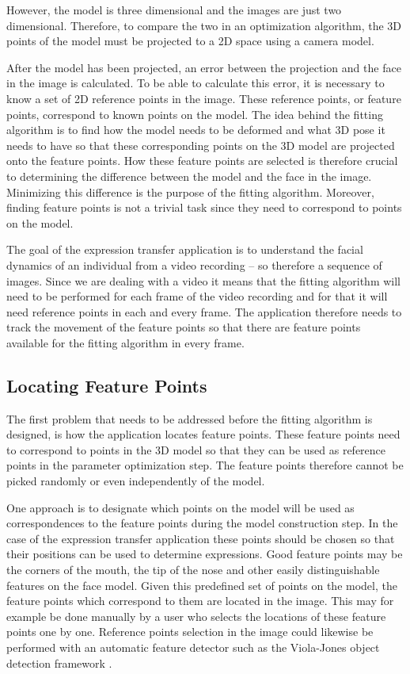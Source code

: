 \documentclass[11pt,a4paper,twoside]{report}
\begin{document}
However, the model is three dimensional and the images are just two dimensional. Therefore, to compare the two in an optimization algorithm, the 3D points
of the model must be projected to a 2D space using a camera model.

After the model has been projected, an error between the projection and the face
in the image is calculated. To be able to calculate this error, it is necessary
to know a set of 2D reference points in the image. These reference points, or feature
points, correspond to known points on the model. The idea behind the
fitting algorithm is to find how the model needs to be deformed and what 3D pose
it needs to have so that these corresponding points on the 3D model are
projected onto the feature points. How these feature points are selected is therefore crucial to
determining the difference between the model and the face in the image. Minimizing this
difference is the purpose of the fitting algorithm. Moreover, finding feature points is
not a trivial task since they need to correspond to points on the model.

The goal of the expression transfer application is to understand the facial
dynamics of an individual from a video recording -- so therefore a sequence of images. Since we are dealing with a
video it means that the fitting algorithm will need to be performed for
each frame of the video recording and for that it will need reference points
in each and every frame. The application therefore needs to track the movement
of the feature points so that there are feature points available for the fitting
algorithm in every frame.

\subsection{Locating Feature Points}
The first problem that needs to be addressed before the fitting algorithm is
designed, is how the application locates feature points. These feature points
need to correspond to points in the 3D model so that they can be used as
reference points in the parameter optimization step. The feature points
therefore cannot be picked randomly or even independently of the model.

One approach is to designate which points on
the model will be used as correspondences to the feature points during the model construction
step. In the case of the expression transfer application these points should be chosen
so that their positions can be used to determine expressions. Good feature points may
be the corners of the mouth, the tip of the nose and other easily
distinguishable features on the face model. Given this predefined set of points
on the model, the feature points which correspond to them are located in the
image. This may for example be done manually by a user who selects the locations of
these feature points one by one. Reference points selection in the image could likewise be performed with an automatic
feature detector such as the Viola-Jones object detection framework \cite{viola}.
\end{document}
